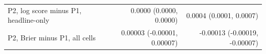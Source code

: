 \begin{tabular}{lrr}
P2, log score minus P1, headline-only & 0.0000 (0.0000, 0.0000) & 0.0004 (0.0001, 0.0007) \\
P2, Brier minus P1, all cells & 0.00003 (-0.00001, 0.00007) & -0.00013 (-0.00019, -0.00007) \\
\bottomrule
\end{tabular}
